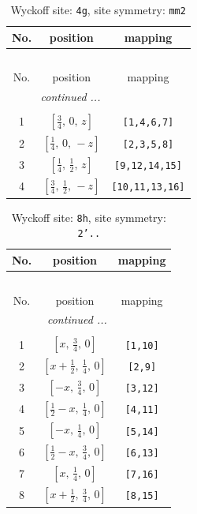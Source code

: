 \documentclass[fleqn,8pt]{jsarticle}
\begin{document}
\renewcommand{\arraystretch}{1.2}
\begin{longtable}{ccc}
\caption{Wyckoff site: {\tt 4g}, site symmetry: {\tt mm2}}
 \\
 \hline \hline
No. & position & mapping \\ \hline \endfirsthead

\multicolumn{2}{l}{\tablename\ \thetable{}} \\
 \hline \hline
No. & position & mapping \\ \hline \endhead

 \hline \hline
\multicolumn{2}{r}{\footnotesize\it continued ...} \\ \endfoot

 \hline \hline
\multicolumn{2}{r}{} \\ \endlastfoot

1 & $\left[ \frac{3}{4},\, 0,\, z \right]$ & {\tt [1,4,6,7]} \\ \hline
2 & $\left[ \frac{1}{4},\, 0,\, - z \right]$ & {\tt [2,3,5,8]} \\ \hline
3 & $\left[ \frac{1}{4},\, \frac{1}{2},\, z \right]$ & {\tt [9,12,14,15]} \\ \hline
4 & $\left[ \frac{3}{4},\, \frac{1}{2},\, - z \right]$ & {\tt [10,11,13,16]} \\
\end{longtable}
\renewcommand{\arraystretch}{1.2}
\begin{longtable}{ccc}
\caption{Wyckoff site: {\tt 8h}, site symmetry: {\tt 2'..}}
 \\
 \hline \hline
No. & position & mapping \\ \hline \endfirsthead

\multicolumn{2}{l}{\tablename\ \thetable{}} \\
 \hline \hline
No. & position & mapping \\ \hline \endhead

 \hline \hline
\multicolumn{2}{r}{\footnotesize\it continued ...} \\ \endfoot

 \hline \hline
\multicolumn{2}{r}{} \\ \endlastfoot

1 & $\left[ x,\, \frac{3}{4},\, 0 \right]$ & {\tt [1,10]} \\ \hline
2 & $\left[ x + \frac{1}{2},\, \frac{1}{4},\, 0 \right]$ & {\tt [2,9]} \\ \hline
3 & $\left[ - x,\, \frac{3}{4},\, 0 \right]$ & {\tt [3,12]} \\ \hline
4 & $\left[ \frac{1}{2} - x,\, \frac{1}{4},\, 0 \right]$ & {\tt [4,11]} \\ \hline
5 & $\left[ - x,\, \frac{1}{4},\, 0 \right]$ & {\tt [5,14]} \\ \hline
6 & $\left[ \frac{1}{2} - x,\, \frac{3}{4},\, 0 \right]$ & {\tt [6,13]} \\ \hline
7 & $\left[ x,\, \frac{1}{4},\, 0 \right]$ & {\tt [7,16]} \\ \hline
8 & $\left[ x + \frac{1}{2},\, \frac{3}{4},\, 0 \right]$ & {\tt [8,15]} \\
\end{longtable}
\end{document}

